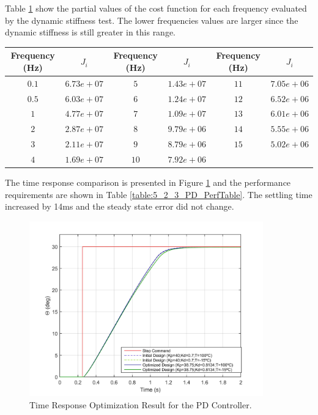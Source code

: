 Table \ref{table:5_2_3_PD_CostFunctionTable} show the partial values of the cost function for each frequency evaluated by the dynamic stiffness test. The lower frequencies values are larger since the dynamic stiffness is still greater in this range. 

\begin{table}[H]
	\label{table:5_2_3_PD_CostFunctionTable}
	\centering
	\resizebox{14cm}{!} {
		\begin{tabular}{|c|c|c|c|c|c|}
			\hline
			Frequency (Hz) & $J_i$ & Frequency (Hz) & $J_i$ & Frequency (Hz) & $J_i$ \\ \hline
			$0.1$ & $6.73e+07$ & $5$ & $1.43e+07$ & $11$ & $7.05e+06$ \\ \hline
			$0.5$ & $6.03e+07$ & $6$ & $1.24e+07$ & $12$ & $6.52e+06$ \\ \hline
			$1$ & $4.77e+07$ & $7$ & $1.09e+07$ & $13$ & $6.01e+06$ \\ \hline
			$2$ & $2.87e+07$ & $8$ & $9.79e+06$ & $14$ & $5.55e+06$ \\ \hline
			$3$ & $2.11e+07$ & $9$ & $8.79e+06$ & $15$ & $5.02e+06$ \\ \hline
			$4$ & $1.69e+07$ & $10$ & $7.92e+06$ &  &  \\ \hline
	\end{tabular}}
\end{table}

The time response comparison is presented in Figure \ref{fig:5_2_3_PD_TimeResp} and the performance requirements are shown in Table \ref{table:5_2_3_PD_PerfTable}. The settling time increased by 14ms and the steady state error did not change.

\begin{figure}[H]
	\centering
	\centerline{\includegraphics[width=0.9\textwidth]{Figuras/5.OptimizationResults/5-2-3-PD-TimeResponseComparison.jpg}}
	\caption{Time Response Optimization Result for the PD Controller.}
	\label{fig:5_2_3_PD_TimeResp}
\end{figure}

